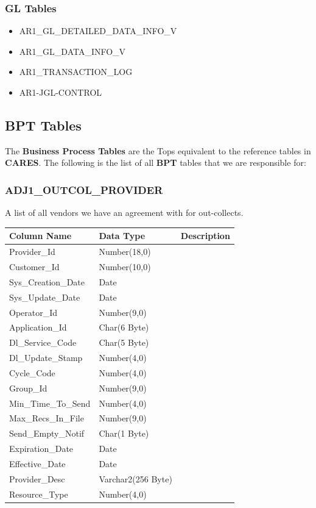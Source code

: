 \documentclass[12pt,twoside]{article}
\begin{document}
\normalsize

\subsubsection{GL Tables}
\label{sec:orgheadline92}
\begin{itemize}
\item AR1\_GL\_DETAILED\_DATA\_INFO\_V
\item AR1\_GL\_DATA\_INFO\_V
\item AR1\_TRANSACTION\_LOG
\item AR1-JGL-CONTROL
\end{itemize}

\subsection{BPT Tables}
\label{sec:orgheadline107}
The \textbf{Business Process Tables} are the Tops equivalent to the
reference tables in \textbf{CARES}. The following is the list of all
\textbf{BPT} tables that we are responsible for:

\subsubsection{ADJ1\_OUTCOL\_PROVIDER}
\label{sec:orgheadline94}
A list of all vendors we have an agreement with for out-collects.
\footnotesize

\begin{center}
\begin{tabular}{lll}
\hline
\textbf{Column Name} & \textbf{Data Type} & \textbf{Description}\\
\hline
Provider\_Id & Number(18,0) & \\
Customer\_Id & Number(10,0) & \\
Sys\_Creation\_Date & Date & \\
Sys\_Update\_Date & Date & \\
Operator\_Id & Number(9,0) & \\
Application\_Id & Char(6 Byte) & \\
Dl\_Service\_Code & Char(5 Byte) & \\
Dl\_Update\_Stamp & Number(4,0) & \\
Cycle\_Code & Number(4,0) & \\
Group\_Id & Number(9,0) & \\
Min\_Time\_To\_Send & Number(4,0) & \\
Max\_Recs\_In\_File & Number(9,0) & \\
Send\_Empty\_Notif & Char(1 Byte) & \\
Expiration\_Date & Date & \\
Effective\_Date & Date & \\
Provider\_Desc & Varchar2(256 Byte) & \\
Resource\_Type & Number(4,0) & \\
\hline
\end{tabular}
\end{center}
\end{document}
